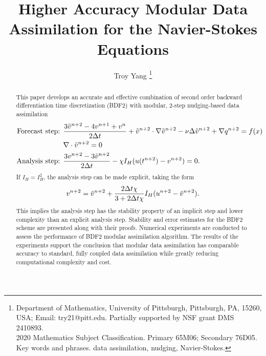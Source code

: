 \documentclass[11pt,a4paper]{article}
\begin{document}
\thispagestyle{empty}

\title{Higher Accuracy Modular Data Assimilation for the Navier-Stokes Equations}

\author[]{
Troy Yang \footnote{Department of Mathematics, University of Pittsburgh, Pittsburgh, PA, 15260, USA; Email: try21@pitt.edu. Partially supported by NSF grant DMS 2410893.\\
2020 Mathematics Subject Classification. Primary 65M06; Secondary 76D05.\\
Key words and phrases. data assimilation, nudging, Navier-Stokes.}}

\date{}

\maketitle

\begin{abstract}
This paper develops an accurate and effective combination of second order backward differentiation time discretization (BDF2) with modular, 2-step nudging-based data assimilation
\begin{align}
    \text{Forecast step: } &\frac{3\Tilde{v}^{n+2}-4v^{n+1}+v^n}{2\Delta t}+\Tilde{v}^{n+2} \cdot \nabla \Tilde{v}^{n+2} - \nu \Delta \Tilde{v}^{n+2} + \nabla q^{n+2}=f(x) \notag \\ &\nabla \cdot \Tilde{v}^{n+2} = 0 \notag \\
    \text{Analysis step: }
    &\frac{3v^{n+2}-3\Tilde{v}^{n+2}}{2\Delta t}-\chi I_H(u(t^{n+2})-v^{n+2})=0. \notag 
\end{align}
If $I_H=I_H^2$, the analysis step can be made explicit, taking the form
\begin{align}
    v^{n+2}=\Tilde{v}^{n+2}+\frac{2\Delta t\chi}{3+2\Delta t\chi}I_H(u^{n+2}-\Tilde{v}^{n+2}). \notag
\end{align}
This implies the analysis step has the stability property of an implicit step and lower complexity than an explicit analysis step. Stability and error estimates for the BDF2 scheme are presented along with their proofs. Numerical experiments are conducted to assess the performance of BDF2 modular assimilation algorithm. The results of the experiments support the conclusion that modular data assimilation has comparable accuracy to standard, fully coupled data assimilation while greatly reducing computational complexity and cost.
\end{abstract}
\end{document}
